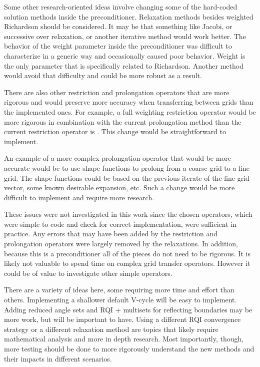 Some other research-oriented ideas involve changing some of the hard-coded solution methods inside the preconditioner. Relaxation methods besides weighted Richardson should be considered. It may be that something like Jacobi, or successive over relaxation, or another iterative method would work better. The behavior of the weight parameter inside the preconditioner was difficult to characterize in a generic way and occasionally caused poor behavior. Weight is the only parameter that is specifically related to Richardson. Another method would avoid that difficulty and could be more robust as a result. 

There are also other restriction and prolongation operators that are more rigorous and would preserve more accuracy when transferring between grids than the implemented ones. For example, a full weighting restriction operator would be more rigorous in combination with the current prolongation method than the current restriction operator is \cite{Briggs2000}. This change would be straightforward to implement. 

An example of a more complex prolongation operator that would be more accurate would be to use shape functions to prolong from a coarse grid to a fine grid. The shape functions could be based on the previous iterate of the fine-grid vector, some known desirable expansion, etc. Such a change would be more difficult to implement and require more research. 

These issues were not investigated in this work since the chosen operators, which were simple to code and check for correct implementation, were sufficient in practice. Any errors that may have been added by the restriction and prolongation operators were largely removed by the relaxations. In addition, because this is a preconditioner all of the pieces do not need to be rigorous. It is likely not valuable to spend time on complex grid transfer operators. However it could be of value to investigate other simple operators. 

There are a variety of ideas here, some requiring more time and effort than others. Implementing a shallower default V-cycle will be easy to implement. Adding reduced angle sets and RQI + multisets for reflecting boundaries may be more work, but will be important to have. Using a different RQI convergence strategy or a different relaxation method are topics that likely require mathematical analysis and more in depth research. Most importantly, though, more testing should be done to more rigorously understand the new methods and their impacts in different scenarios.  

